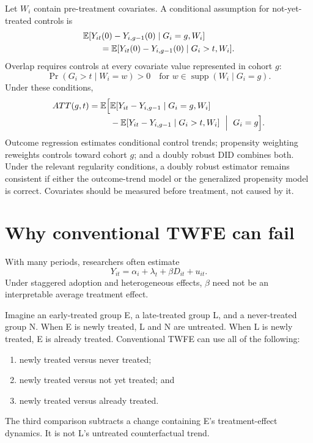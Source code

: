 Let $W_i$ contain pre-treatment covariates.  A conditional assumption for
not-yet-treated controls is
\begin{align}
  &\mathbb{E}[Y_{it}(0)-Y_{i,g-1}(0)\mid G_i=g,W_i]\notag\\
  &\qquad=\mathbb{E}[Y_{it}(0)-Y_{i,g-1}(0)\mid G_i>t,W_i].
  \label{eq:did-conditional-pt}
\end{align}
Overlap requires controls at every covariate value represented in cohort $g$:
\begin{equation}
  \Pr(G_i>t\mid W_i=w)>0
  \quad\text{for }w\in\operatorname{supp}(W_i\mid G_i=g).
  \label{eq:did-overlap}
\end{equation}
Under these conditions,
\begin{align}
 ATT(g,t)=\mathbb{E}\Big[&
   \mathbb{E}[Y_{it}-Y_{i,g-1}\mid G_i=g,W_i]
   \notag\\[-2pt]
 &-\mathbb{E}[Y_{it}-Y_{i,g-1}\mid G_i>t,W_i]
   \ \Bigm|\ G_i=g\Big].
 \label{eq:did-conditional-id}
\end{align}
Outcome regression estimates conditional control trends; propensity weighting
reweights controls toward cohort $g$; and a doubly robust DID combines both.
Under the relevant regularity conditions, a doubly robust estimator remains
consistent if either the outcome-trend model or the generalized propensity
model is correct.  Covariates should be measured before treatment, not caused
by it.

\section{Why conventional TWFE can fail}
\label{sec:did-twfe-failure}

With many periods, researchers often estimate
\begin{equation}
  Y_{it}=\alpha_i+\lambda_t+\beta D_{it}+u_{it}.
  \label{eq:did-static-twfe}
\end{equation}
Under staggered adoption and heterogeneous effects, $\beta$ need not be an
interpretable average treatment effect.

Imagine an early-treated group E, a late-treated group L, and a never-treated
group N.  When E is newly treated, L and N are untreated.  When L is newly
treated, E is already treated.  Conventional TWFE can use all of the following:
\begin{enumerate}
  \item newly treated versus never treated;
  \item newly treated versus not yet treated; and
  \item newly treated versus already treated.
\end{enumerate}
The third comparison subtracts a change containing E's treatment-effect
dynamics.  It is not L's untreated counterfactual trend.

